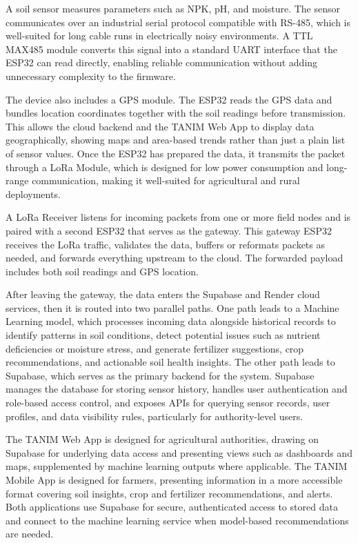 {	A soil sensor measures parameters such as NPK, pH, and moisture. The sensor communicates over an industrial serial protocol compatible with RS-485, which is well-suited for long cable runs in electrically noisy environments. A TTL MAX485 module converts this signal into a standard UART interface that the ESP32 can read directly, enabling reliable communication without adding unnecessary complexity to the firmware.
	
	The device also includes a GPS module. The ESP32 reads the GPS data and bundles location coordinates together with the soil readings before transmission. This allows the cloud backend and the TANIM Web App to display data geographically, showing maps and area-based trends rather than just a plain list of sensor values. Once the ESP32 has prepared the data, it transmits the packet through a LoRa Module, which is designed for low power consumption and long-range communication, making it well-suited for agricultural and rural deployments.
	
	A LoRa Receiver listens for incoming packets from one or more field nodes and is paired with a second ESP32 that serves as the gateway. This gateway ESP32 receives the LoRa traffic, validates the data, buffers or reformats packets as needed, and forwards everything upstream to the cloud. The forwarded payload includes both soil readings and GPS location.
	
	After leaving the gateway, the data enters the Supabase and Render cloud services, then it is routed into two parallel paths. One path leads to a Machine Learning model, which processes incoming data alongside historical records to identify patterns in soil conditions, detect potential issues such as nutrient deficiencies or moisture stress, and generate fertilizer suggestions, crop recommendations, and actionable soil health insights. The other path leads to Supabase, which serves as the primary backend for the system. Supabase manages the database for storing sensor history, handles user authentication and role-based access control, and exposes APIs for querying sensor records, user profiles, and data visibility rules, particularly for authority-level users.
	
	The TANIM Web App is designed for agricultural authorities, drawing on Supabase for underlying data access and presenting views such as dashboards and maps, supplemented by machine learning outputs where applicable. The TANIM Mobile App is designed for farmers, presenting information in a more accessible format covering soil insights, crop and fertilizer recommendations, and alerts. Both applications use Supabase for secure, authenticated access to stored data and connect to the machine learning service when model-based recommendations are needed.
	
}
